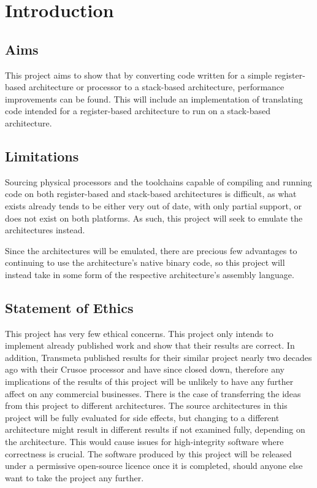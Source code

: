 \chapter{Introduction}\label{ch:introduction}
\section{Aims}
This project aims to show that by converting code written for a simple
register-based architecture or processor to a stack-based architecture,
performance improvements can be found. This will include an implementation of
translating code intended for a register-based architecture to run on a
stack-based architecture.

\section{Limitations}
Sourcing physical processors and the toolchains capable of compiling and running
code on both register-based and stack-based architectures is difficult, as what
exists already tends to be either very out of date, with only partial support,
or does not exist on both platforms. As such, this project will seek to emulate
the architectures instead.

Since the architectures will be emulated, there are precious few advantages to
continuing to use the architecture's native binary code, so this project will
instead take in some form of the respective architecture's assembly language.

\section{Statement of Ethics}
This project has very few ethical concerns. This project only intends to
implement already published work and show that their results are correct. In
addition, Transmeta published results for their similar project nearly two
decades ago with their Crusoe processor and have since closed down, therefore
any implications of the results of this project will be unlikely to have any
further affect on any commercial businesses. There is the case of transferring
the ideas from this project to different architectures. The source architectures
in this project will be fully evaluated for side effects, but changing to a
different architecture might result in different results if not examined fully,
depending on the architecture. This would cause issues for high-integrity
software where correctness is crucial. The software produced by this project
will be released under a permissive open-source licence once it is completed,
should anyone else want to take the project any further.

